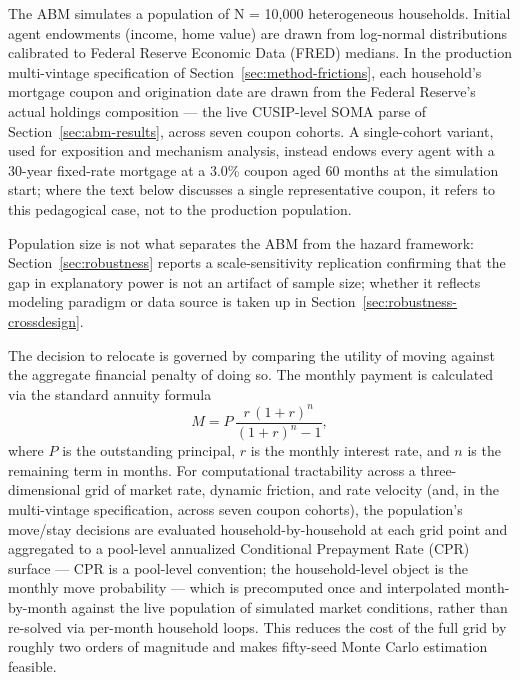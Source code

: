 \documentclass[12pt]{article}
\begin{document}
The ABM simulates a population of N = 10,000 heterogeneous households. Initial agent endowments (income, home value) are drawn from log-normal distributions calibrated to Federal Reserve Economic Data (FRED) medians. In the production multi-vintage specification of Section~\ref{sec:method-frictions}, each household's mortgage coupon and origination date are drawn from the Federal Reserve's actual holdings composition --- the live CUSIP-level SOMA parse of Section~\ref{sec:abm-results}, across seven coupon cohorts. A single-cohort variant, used for exposition and mechanism analysis, instead endows every agent with a 30-year fixed-rate mortgage at a 3.0\% coupon aged 60 months at the simulation start; where the text below discusses a single representative coupon, it refers to this pedagogical case, not to the production population.

Population size is not what separates the ABM from the hazard framework: Section~\ref{sec:robustness} reports a scale-sensitivity replication confirming that the gap in explanatory power is not an artifact of sample size; whether it reflects modeling paradigm or data source is taken up in Section~\ref{sec:robustness-crossdesign}.

The decision to relocate is governed by comparing the utility of moving against the aggregate financial penalty of doing so. The monthly payment is calculated via the standard annuity formula
\begin{equation}\label{eq:annuity}
M = P\,\frac{r\,(1+r)^{n}}{(1+r)^{n}-1},
\end{equation}
where $P$ is the outstanding principal, $r$ is the monthly interest rate, and $n$ is the remaining term in months. For computational tractability across a three-dimensional grid of market rate, dynamic friction, and rate velocity (and, in the multi-vintage specification, across seven coupon cohorts), the population's move/stay decisions are evaluated household-by-household at each grid point and aggregated to a pool-level annualized Conditional Prepayment Rate (CPR) surface --- CPR is a pool-level convention; the household-level object is the monthly move probability --- which is precomputed once and interpolated month-by-month against the live population of simulated market conditions, rather than re-solved via per-month household loops. This reduces the cost of the full grid by roughly two orders of magnitude and makes fifty-seed Monte Carlo estimation feasible.
\end{document}
